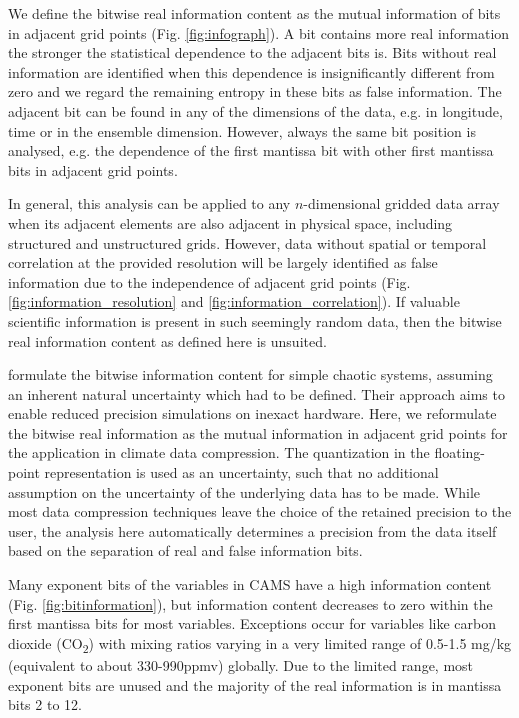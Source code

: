 We define the bitwise real information content as the mutual information
\citep{Shannon1948,MacKay2003a,Schreiber2000,Kraskov2004,Pothapakula2019,DelSole2004} of bits in
adjacent grid points (Fig. \ref{fig:infograph}). A bit contains more real information the stronger the statistical
dependence to the adjacent bits is. Bits without real information are identified when this dependence is
insignificantly different from zero and we regard the remaining entropy in these bits as false information.
The adjacent bit can be found in any of the dimensions of the data, e.g. in longitude, time or in the ensemble
dimension. However, always the same bit position is analysed, e.g. the dependence of the first mantissa bit
with other first mantissa bits in adjacent grid points. 

In general, this analysis can be applied to any $n$-dimensional gridded data array when its adjacent elements
are also adjacent in physical space, including structured and unstructured grids. However, data without spatial
or temporal correlation at the provided resolution will be largely identified as false information due to the
independence of adjacent grid points (Fig. \ref{fig:information_resolution} and \ref{fig:information_correlation}).
If valuable scientific information is present in such seemingly random data, then the bitwise real information
content as defined here is unsuited. 

\cite{Jeffress2017a} formulate the bitwise information content for simple chaotic systems, assuming an
inherent natural uncertainty which had to be defined. Their approach aims to enable reduced precision
simulations on inexact hardware. Here, we reformulate the bitwise real information as the mutual information
in adjacent grid points for the application in climate data compression. The quantization in the floating-point
representation is used as an uncertainty, such that no additional assumption on the uncertainty of the underlying
data has to be made. While most data compression techniques leave the choice of the retained precision to the user,
the analysis here automatically determines a precision from the data itself based on the separation of real and
false information bits.     

Many exponent bits of the variables in CAMS have a high information content (Fig. \ref{fig:bitinformation}),
but information content decreases to zero within the first mantissa bits for most variables.
Exceptions occur for variables like carbon dioxide (CO\textsubscript{2}) with mixing ratios varying in a very
limited range of 0.5-1.5 mg/kg (equivalent to about 330-990ppmv) globally. Due to the limited range,
most exponent bits are unused and the majority of the real information is in mantissa bits 2 to 12.

